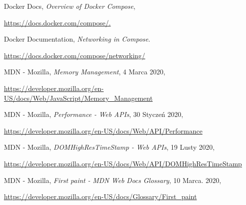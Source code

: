 \begin{thebibliography}{99}
Docker Docs,
\emph{Overview of Docker Compose},

\url{https://docs.docker.com/compose/.}

Docker Documentation,
\emph{Networking in Compose}.

\url{https://docs.docker.com/compose/networking/}

MDN - Mozilla,
\emph{Memory Management},
4 Marca 2020,

\url{https://developer.mozilla.org/en-US/docs/Web/JavaScript/Memory_Management}

MDN - Mozilla,
\emph{Performance - Web APIs},
30 Styczeń 2020,

\url{https://developer.mozilla.org/en-US/docs/Web/API/Performance}

MDN - Mozilla,
\emph{DOMHighResTimeStamp - Web APIs},
19 Lusty 2020,

\url{https://developer.mozilla.org/en-US/docs/Web/API/DOMHighResTimeStamp}

MDN - Mozilla,
\emph{First paint - MDN Web Docs Glossary},
10 Marca. 2020,

\url{https://developer.mozilla.org/en-US/docs/Glossary/First_paint}


\end{thebibliography}


